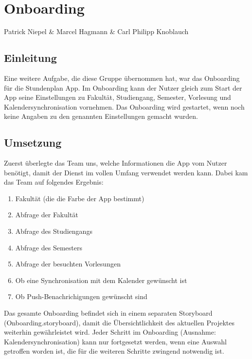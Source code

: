 \chapter{Onboarding}
Patrick Niepel \& Marcel Hagmann \& Carl Philipp Knoblauch

\section{Einleitung}
Eine weitere Aufgabe, die diese Gruppe übernommen hat, war das Onboarding für die Stundenplan App. Im Onboarding kann der Nutzer gleich zum Start der App seine Einstellungen zu Fakultät, Studiengang, Semester, Vorlesung und Kalendersynchronisation vornehmen. Das Onboarding wird gestartet, wenn noch keine Angaben zu den genannten Einstellungen gemacht wurden.


\section{Umsetzung}
Zuerst überlegte das Team uns, welche Informationen die App vom Nutzer benötigt, damit der Dienst im vollen Umfang verwendet werden kann.
Dabei kam das Team auf folgendes Ergebnis:
\begin{enumerate}
\item Fakultät (die die Farbe der App bestimmt)
\item Abfrage der Fakultät
\item Abfrage des Studiengangs
\item Abfrage des Semesters
\item  Abfrage der besuchten Vorlesungen
\item Ob eine Synchronisation mit dem Kalender gewünscht ist
\item Ob Push-Benachrichigungen gewünscht sind
\end{enumerate}

Das gesamte Onboarding befindet sich in einem separaten Storyboard (Onboarding.storyboard), damit die Übersichtlichkeit des aktuellen Projektes weiterhin gewährleistet wird.
Jeder Schritt im Onboarding (Ausnahme: Kalendersynchronisation) kann nur fortgesetzt werden, wenn eine Auswahl getroffen worden ist, die für die weiteren Schritte zwingend notwendig ist.